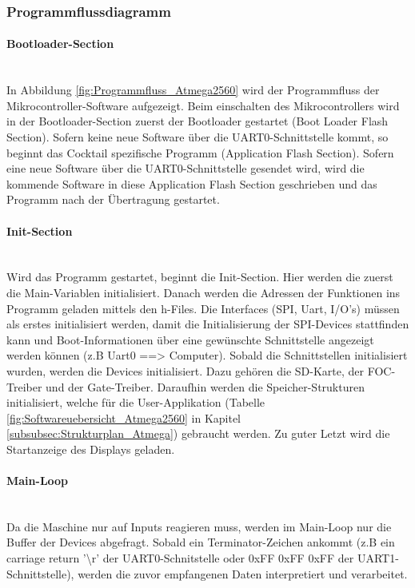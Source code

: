 \newpage
\subsubsection{Programmflussdiagramm}
\label{subsubsec:Programmflussdiagramm}

\paragraph{Bootloader-Section}\mbox{}\\
In Abbildung \ref{fig:Programmfluss_Atmega2560} wird der Programmfluss der Mikrocontroller-Software aufgezeigt. Beim einschalten des Mikrocontrollers wird in der Bootloader-Section zuerst der Bootloader gestartet (Boot Loader Flash Section). Sofern keine neue Software über die UART0-Schnittstelle kommt, so beginnt das Cocktail spezifische Programm (Application Flash Section). Sofern eine neue Software über die UART0-Schnittstelle gesendet wird, wird die kommende Software in diese Application Flash Section geschrieben und das Programm nach der Übertragung gestartet.

\paragraph{Init-Section}\mbox{}\\
Wird das Programm gestartet, beginnt die Init-Section. Hier werden die zuerst die Main-Variablen initialisiert. Danach werden die Adressen der Funktionen ins Programm geladen mittels den h-Files. Die Interfaces (SPI, Uart, I/O's) müssen als erstes initialisiert werden, damit die Initialisierung der SPI-Devices stattfinden kann und Boot-Informationen über eine gewünschte Schnittstelle angezeigt werden können (z.B Uart0 ==> Computer). Sobald die Schnittstellen initialisiert wurden, werden die Devices initialisiert. Dazu gehören die SD-Karte, der FOC-Treiber und der Gate-Treiber. Daraufhin werden die Speicher-Strukturen initialisiert, welche für die User-Applikation (Tabelle \ref{fig:Softwareuebersicht_Atmega2560} in Kapitel \ref{subsubsec:Strukturplan_Atmega}) gebraucht werden. Zu guter Letzt wird die Startanzeige des Displays geladen.

\paragraph{Main-Loop}\mbox{}\\
Da die Maschine nur auf Inputs reagieren muss, werden im Main-Loop nur die Buffer der Devices abgefragt. Sobald ein Terminator-Zeichen ankommt (z.B ein carriage return '\textbackslash r' der UART0-Schnitstelle oder 0xFF 0xFF 0xFF der UART1-Schnittstelle), werden die zuvor empfangenen Daten interpretiert und verarbeitet.

